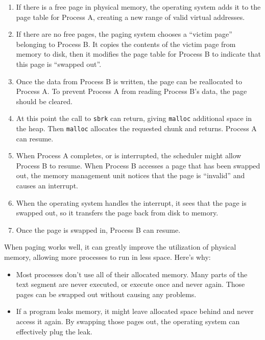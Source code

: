 \documentclass[12pt]{book}
\begin{document}
{\begin{enumerate}
\item If there is a free page in physical memory, the operating system
adds it to the page table for Process A, creating a new range of valid
virtual addresses.

\item If there are no free pages, the paging system chooses a ``victim
page'' belonging to Process B.  It copies the contents of the victim
page from memory to disk, then it modifies the page table for Process
B to indicate that this page is ``swapped out''.

\item Once the data from Process B is written, the page can be reallocated
to Process A.  To prevent Process A from reading Process B's data, the
page should be cleared.

\item At this point the call to {\tt sbrk} can return, giving {\tt malloc}
additional space in the heap.  Then {\tt malloc} allocates the requested
chunk and returns.  Process A can resume.

\item When Process A completes, or is interrupted, the scheduler might
allow Process B to resume.  When Process B accesses a page that has been swapped out, the memory management unit notices that the page is ``invalid'' and causes an interrupt.

\item When the operating system handles the interrupt, it sees that
the page is swapped out, so it transfers the page back from disk to
memory.  

\item Once the page is swapped in, Process B can resume.

\end{enumerate}

When paging works well, it can greatly improve the utilization of
physical memory, allowing more processes to run in less space.
Here's why:

\begin{itemize}

\item Most processes don't use all of their allocated memory.  Many
  parts of the text segment are never executed, or execute once and
  never again.  Those pages can be swapped out without causing any
  problems.

\item If a program leaks memory, it might leave allocated space behind
  and never access it again.  By swapping those pages out, the
  operating system can effectively plug the leak.


\end{itemize}}
\end{document}
